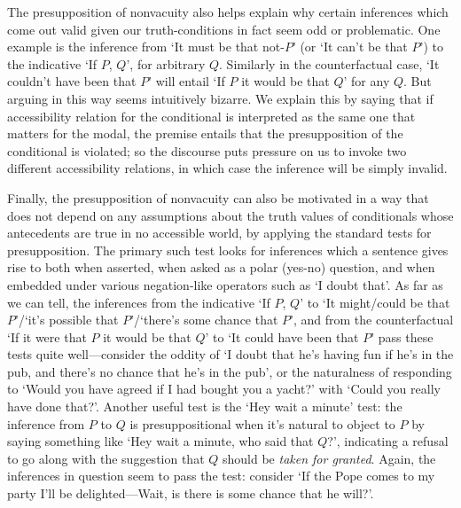 \documentclass[If.tex]{subfiles}
\begin{document}
The presupposition of nonvacuity also helps explain why certain inferences which come out valid given our truth-conditions in fact seem odd or problematic.  One example is the inference from ‘It must be that not-$P$’ (or ‘It can't be that $P$’) to the indicative ‘If $P$, $Q$’, for arbitrary $Q$.   Similarly in the counterfactual case, ‘It couldn't have been that $P$’ will entail ‘If $P$ it would be that $Q$’ for any $Q$.  But arguing in this way seems intuitively bizarre.  We explain this by saying that if accessibility relation for the conditional is interpreted as the same one that matters for the modal, the premise entails that the presupposition of the conditional is violated; so the discourse puts pressure on us to invoke two different accessibility relations, in which case the inference will be simply invalid.

Finally, the presupposition of nonvacuity can also be motivated in a way that does not depend on any assumptions about the truth values of conditionals whose antecedents are true in no accessible world, by applying the standard tests for presupposition.  The primary such test looks for inferences which a sentence gives rise to both when asserted, when asked as a polar (yes-no) question, and when embedded under various negation-like operators such as ‘I doubt that’.  As far as we can tell, the inferences from the indicative ‘If $P$, $Q$’ to ‘It might/could be that $P$’/‘it's possible that $P$’/‘there's some chance that $P$’, and from the counterfactual ‘If it were that $P$ it would be that $Q$’ to ‘It could have been that $P$’ pass these tests quite well---consider the oddity of ‘I doubt that he's having fun if he's in the pub, and there's no chance that he's in the pub’, or the naturalness of responding to ‘Would you have agreed if I had bought you a yacht?’ with ‘Could you really have done that?’.  Another useful test \citep{FintelWYBI} is the ‘Hey wait a minute’ test: the inference from $P$ to $Q$ is presuppositional when it's natural to object to $P$ by saying something like ‘Hey wait a minute, who said that $Q$?’, indicating a refusal to go along with the suggestion that $Q$ should be \emph{taken for granted}.  Again, the inferences in question seem to pass the test: consider ‘If the Pope comes to my party I'll be delighted---Wait, is there is some chance that he will?’.  
\end{document}
